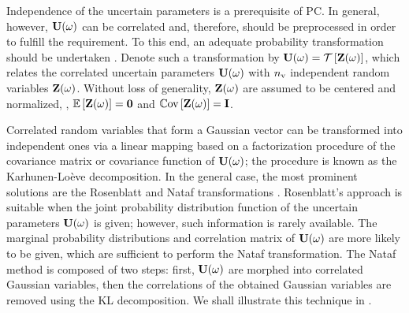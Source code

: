 Independence of the uncertain parameters is a prerequisite of PC.
In general, however, $\mathbf{U}(\omega)$ can be correlated and, therefore, should be preprocessed in order to fulfill the requirement.
To this end, an adequate probability transformation should be undertaken \cite{eldred2009}.
Denote such a transformation by $\vU(\o) = \oTransform{\vZ(\o)}$, which relates the correlated uncertain parameters $\mathbf{U}(\omega)$ with ${n_\text{v}}$ independent random variables $\mathbf{Z}(\omega)$.
Without loss of generality, $\mathbf{Z}(\omega)$ are assumed to be centered and normalized, \ie, $\oExp{\vZ(\o)} = \mZero$ and $\oCov{\vZ(\o)} = \mI$.

Correlated random variables that form a Gaussian vector can be transformed into independent ones via a linear mapping based on a factorization procedure of the covariance matrix or covariance function of $\mathbf{U}(\omega)$; the procedure is known as the Karhunen-Lo\`{e}ve decomposition.
In the general case, the most prominent solutions are the Rosenblatt \cite{rosenblatt1952} and Nataf transformations \cite{li2008}.
Rosenblatt's approach is suitable when the joint probability distribution function of the uncertain parameters $\mathbf{U}(\omega)$ is given; however, such information is rarely available.
The marginal probability distributions and correlation matrix of $\mathbf{U}(\omega)$ are more likely to be given, which are sufficient to perform the Nataf transformation.
The Nataf method is composed of two steps: first, $\mathbf{U}(\omega)$ are morphed into correlated Gaussian variables, then the correlations of the obtained Gaussian variables are removed using the KL decomposition.
We shall illustrate this technique in .
